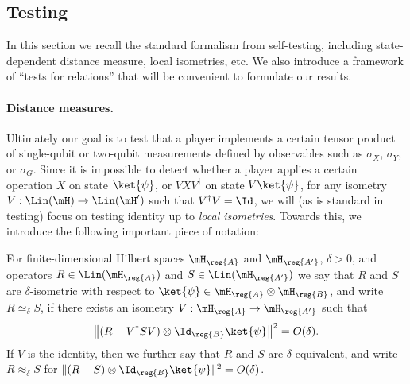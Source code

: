 %


\subsection{Testing}
\label{sec:general-rigidity}

In this section we recall the standard formalism from self-testing, including state-dependent distance measure, local isometries, etc. We also introduce a framework of ``tests for relations'' that will be convenient to formulate our results. 


\paragraph{Distance measures.}
Ultimately our goal is to test that a player implements a certain tensor product of single-qubit or two-qubit measurements defined by observables such as $\sigma_X$, $\sigma_Y$, or $\sigma_G$. Since it is impossible to detect whether a player applies a certain operation $X$ on state $\ket{\psi}$, or $VXV^\dagger$ on state $V\ket{\psi}$, for any isometry $V:\Lin(\mH)\to\Lin(\mH')$ such that $V^\dagger V = \Id$, we will (as is standard in testing) focus on testing identity up to \emph{local isometries}. Towards this, we introduce the following important piece of notation: 

\begin{definition}
For finite-dimensional Hilbert spaces $\mH_{\reg{A}}$ and $\mH_{\reg{A'}}$, $\delta>0$, and operators $R \in\Lin(\mH_{\reg{A}})$ and $S\in\Lin(\mH_{\reg{A'}})$ we say that $R$ and $S$ are $\delta$-isometric with respect to $\ket{\psi} \in \mH_{\reg{A}} \otimes \mH_{\reg{B}}$, and write $R\simeq_\delta S$, if there exists an isometry $V:\mH_{\reg{A}}\to\mH_{\reg{A'}}$ such that 
$$\big\|( R-V^\dagger SV)\otimes \Id_{\reg{B}} \ket{\psi}\big\|^2=O(\delta).$$
If $V$ is the identity, then we further say that $R$ and $S$ are $\delta$-equivalent, and write $R\approx_\delta S$ for $\| ( R- S) \otimes \Id_{\reg{B}} \ket{\psi}\|^2=O(\delta)$.
\end{definition}

